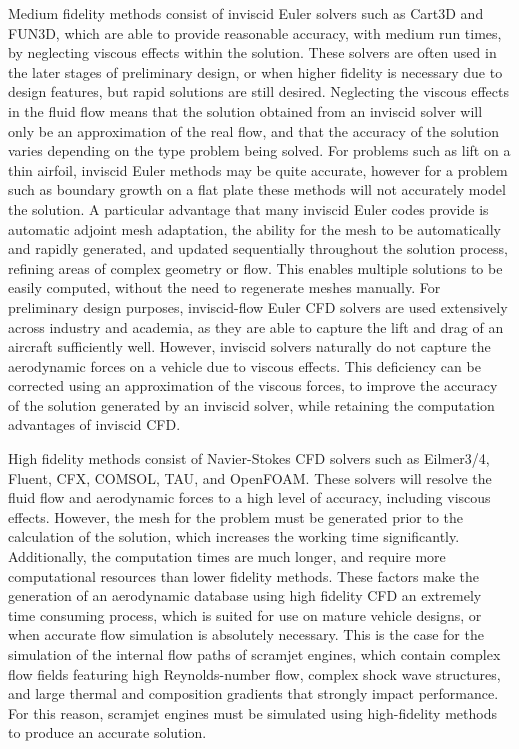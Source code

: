 Medium fidelity methods consist of inviscid Euler solvers such as Cart3D\cite{CART3D} and FUN3D\cite{fun3d}, which are able to provide reasonable accuracy, with medium run times, by neglecting viscous effects within the solution. These solvers are often used in the later stages of preliminary design, or when higher fidelity is necessary due to design features, but rapid solutions are still desired.  Neglecting the viscous effects in the fluid flow means that the solution obtained from an inviscid solver will only be an approximation of the real flow, and that the accuracy of the solution varies depending on the type problem being solved. For problems such as lift on a thin airfoil, inviscid Euler methods may be quite accurate, however for a problem such as boundary growth on a flat plate these methods will not accurately model the solution\cite{NASAEuler}. A particular advantage that many inviscid Euler codes provide is automatic adjoint mesh adaptation, the ability for the mesh to be automatically and rapidly generated, and updated sequentially throughout the solution process, refining areas of complex geometry or flow. This enables multiple solutions to be easily computed, without the need to regenerate meshes manually. For preliminary design purposes, inviscid-flow Euler CFD solvers are used extensively across industry and academia\cite{Almosnino2016}, as they are able to capture the lift and drag of an aircraft sufficiently well. However, inviscid solvers naturally do not capture the aerodynamic forces on a vehicle due to viscous effects. This deficiency can be corrected using an approximation of the viscous forces, to improve the accuracy of the solution generated by an inviscid solver, while retaining the computation advantages of inviscid CFD\cite{Ward2018}. 

High fidelity methods consist of Navier-Stokes CFD solvers such as Eilmer3/4\cite{Gollan2013b}, Fluent\cite{Ansys2014}, CFX\cite{CFX}, COMSOL\cite{comsol}, TAU\cite{Schwamborn2006}, and OpenFOAM\cite{openfoam}. These solvers will resolve the fluid flow and aerodynamic forces to a high level of accuracy, including viscous effects. However, the mesh for the problem must be generated prior to the calculation of the solution, which increases the working time significantly. Additionally, the computation times are much longer, and require more computational resources than lower fidelity methods. These factors make the generation of an aerodynamic database using high fidelity CFD an extremely time consuming process, which is suited for use on mature vehicle designs, or when accurate flow simulation is absolutely necessary. 
This is the case for the simulation of the internal flow paths of scramjet engines, which contain complex flow fields featuring high Reynolds-number flow, complex shock wave structures, and large thermal and composition gradients that strongly impact performance\cite{Segal2009}. For this reason, scramjet engines must be simulated using high-fidelity methods to produce an accurate solution. 




